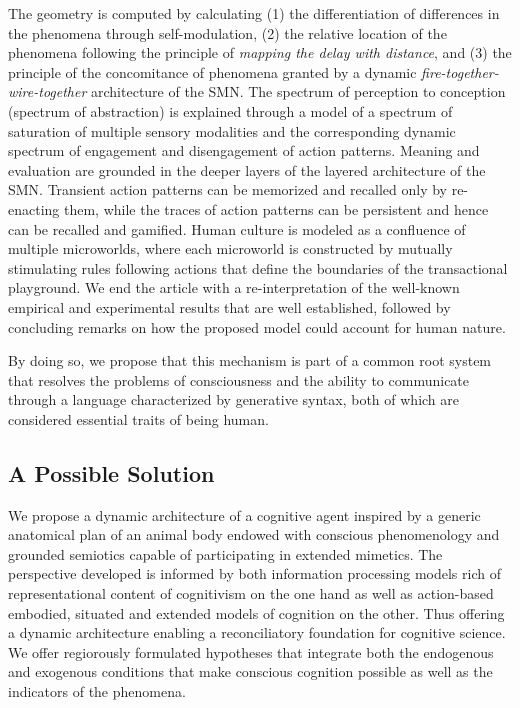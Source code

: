 The geometry is computed by calculating (1) the differentiation of differences in the phenomena through self-modulation, (2) the relative location of the phenomena following the principle of \textit{mapping the delay with distance}, and (3) the principle of the concomitance of phenomena granted by a dynamic \textit{fire-together-wire-together} architecture of the SMN. The spectrum of perception to conception (spectrum of abstraction) is explained through a model of a spectrum of saturation of multiple sensory modalities and the corresponding dynamic spectrum of engagement and disengagement of action patterns. Meaning and evaluation are grounded in the deeper layers of the layered architecture of the SMN.  Transient action patterns can be memorized and recalled only by re-enacting them, while the traces of action patterns can be persistent and hence can be recalled and gamified. Human culture is modeled as a confluence of multiple microworlds, where each microworld is constructed by mutually stimulating rules following actions that define the boundaries of the transactional playground. We end the article with a re-interpretation of the well-known empirical and experimental results that are well established, followed by concluding remarks on how the proposed model could account for human nature.


By doing so, we propose that this mechanism is part of a common root system that resolves the problems of consciousness and the ability to communicate through a language characterized by generative syntax, both of which are considered essential traits of being human.  




\subsection{A Possible Solution}

We propose a dynamic architecture of a cognitive agent inspired by a generic anatomical plan of an animal body endowed with conscious phenomenology and grounded semiotics capable of participating in extended mimetics.  The perspective developed is informed by both information processing models rich of representational content of cognitivism on the one hand as well as action-based embodied, situated and extended models of cognition on the other.  Thus offering a dynamic architecture enabling a reconciliatory foundation for cognitive science. We offer regiorously formulated hypotheses that integrate both the endogenous and exogenous conditions that make conscious cognition possible as well as the indicators of the phenomena. 

